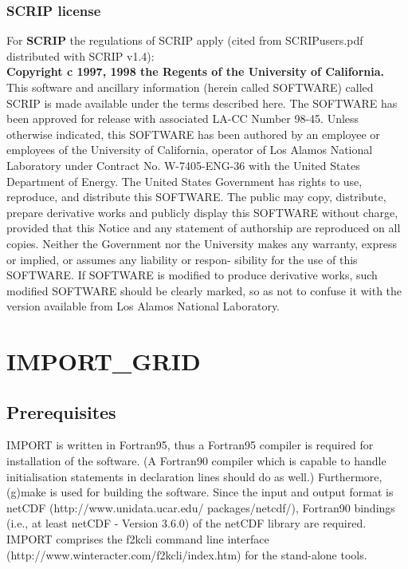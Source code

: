 \documentclass[11pt,twoside]{report}
\begin{document}
\subsection{SCRIP license\label{Lic2}}
For {\bf SCRIP} the regulations of SCRIP apply (cited from SCRIPusers.pdf distributed with SCRIP v1.4):\\
{\bf \large Copyright c 1997, 1998 the Regents of the University of California.}\\
This software and ancillary information (herein called SOFTWARE) called
SCRIP is made available under the terms described here. The SOFTWARE
has been approved for release with associated LA-CC Number 98-45.
Unless otherwise indicated, this SOFTWARE has been authored by an
employee or employees of the University of California, operator of Los Alamos
National Laboratory under Contract No. W-7405-ENG-36 with the United
States Department of Energy. The United States Government has rights
to use, reproduce, and distribute this SOFTWARE. The public may copy,
distribute, prepare derivative works and publicly display this SOFTWARE
without charge, provided that this Notice and any statement of authorship
are reproduced on all copies. Neither the Government nor the University
makes any warranty, express or implied, or assumes any liability or respon-
sibility for the use of this SOFTWARE.
If SOFTWARE is modified to produce derivative works, such modified
SOFTWARE should be clearly marked, so as not to confuse it with the
version available from Los Alamos National Laboratory.

\chapter{IMPORT\_GRID\label{IMPGRID}}

\section{Prerequisites\label{Prereq}}
IMPORT is written in Fortran95, thus a Fortran95 compiler is required for
installation of the software. 
(A Fortran90 compiler which is capable to handle initialisation
statements in declaration lines should do as well.) Furthermore,
(g)make is used for building the software.
Since the input and output format is netCDF (http://www.unidata.ucar.edu/
packages/netcdf/), Fortran90 bindings (i.e., at least netCDF - Version 3.6.0) of
the netCDF library are required.
IMPORT comprises the f2kcli command line interface
(http://www.winteracter.com/f2kcli/index.htm) for the stand-alone
tools. 
\end{document}
